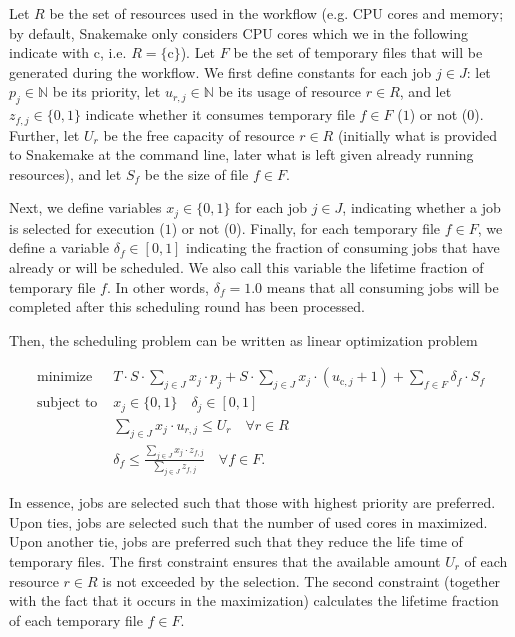 \documentclass[parskip=half]{scrartcl}
\begin{document}
\newcommand{\N}{\mathbb{N}}
\newcommand{\cores}{\text{c}}

Let $R$ be the set of resources used in the workflow (e.g. CPU cores and memory; by default, Snakemake only considers CPU cores which we in the following indicate with $\cores$, i.e. $R = \{\cores\}$).
Let $F$ be the set of temporary files that will be generated during the workflow.
We first define constants for each job $j \in J$: let $p_j \in \N$ be its priority, let $u_{r,j} \in \N$ be its usage of resource $r \in R$, and let $z_{f,j} \in \{0,1\}$ indicate whether it consumes temporary file $f \in F$ ($1$) or not ($0$).
Further, let $U_r$ be the free capacity of resource $r \in R$ (initially what is provided to Snakemake at the command line, later what is left given already running resources), and let $S_f$ be the size of file $f \in F$.

Next, we define variables $x_j \in \{0,1\}$ for each job $j \in J$, indicating whether a job is selected for execution ($1$) or not ($0$).
Finally, for each temporary file $f \in F$, we define a variable $\delta_f \in [0,1]$ indicating the fraction of consuming jobs that have already or will be scheduled.
We also call this variable the lifetime fraction of temporary file $f$.
In other words, $\delta_f = 1.0$ means that all consuming jobs will be completed after this scheduling round has been processed.

Then, the scheduling problem can be written as linear optimization problem 

\begin{align*}
	\text{minimize } & T \cdot S \cdot \sum_{j \in J} x_j \cdot p_j + S \cdot \sum_{j \in J} x_j \cdot (u_{\cores,j} + 1) + \sum_{f \in F} \delta_f \cdot S_f \\ \text{subject to } & x_j \in \{0,1\} \quad \delta_j \in [0,1]\\ \quad & \sum_{j \in J} x_j \cdot u_{r,j} \leq U_r \quad \forall r \in R\\ \quad & \delta_f \leq \frac{\sum_{j \in J} x_j \cdot z_{f,j}}{\sum_{j \in J} z_{f,j}} \quad\forall f \in F.
\end{align*}

In essence, jobs are selected such that those with highest priority are preferred.
Upon ties, jobs are selected such that the number of used cores in maximized.
Upon another tie, jobs are preferred such that they reduce the life time of temporary files.
The first constraint ensures that the available amount $U_r$ of each resource $r \in R$ is not exceeded by the selection.
The second constraint (together with the fact that it occurs in the maximization) calculates the lifetime fraction of each temporary file $f \in F$.
\end{document}

